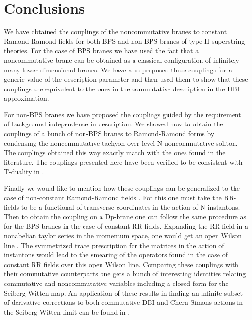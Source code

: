 \documentclass[a4paper,a4paper]{amsproc}
\theoremstyle{definition}
\theoremstyle{remark}
\numberwithin{equation}{section}
\begin{document}
\section{Conclusions}
We have obtained the couplings of the noncommutative branes to constant
Ramond-Ramond fields for both BPS and non-BPS branes of type II
superstring theories. For the case of BPS branes we have used the fact
that a noncommutative brane can be obtained as a classical
configuration of infinitely many lower dimensional branes. We have
also proposed these couplings for a generic value of the description
parameter and then used them to show that these couplings are
equivalent to the ones in the commutative \coordHE{} description in the
DBI approximation. 

For non-BPS branes we have proposed the couplings guided by the
requirement of background independence in \coordHE{} description. We
showed how to obtain the couplings of a bunch of non-BPS branes to
Ramond-Ramond forms by condensing the noncommutative tachyon over level N
noncommutative soliton. The couplings obtained this way exactly match
with the ones found in the literature. The couplings presented here
have been verified to be consistent with T-duality in \cite{tatar}.

Finally we would like to mention how these couplings can be
generalized to the case of non-constant Ramond-Ramond fields
\cite{okawao, smnvstwo, micheliutwo}. For this one must take the
RR-fields to be a functional of transverse coordinates in
the action of N instantons. Then to obtain the coupling on a Dp-brane
one can follow the same procedure as for the BPS branes in the case of
constant RR-fields. Expanding the RR-field in a
nonabelian taylor series in the momentum space, one would get an open
Wilson line \cite{liu, dastrivedi}. The symmetrized trace prescription
for the matrices in the action of instantons would lead to the
smearing of the operators found in the case of constant RR fields over
this open Wilson line. Comparing these couplings with their
commutative counterparts one gets a bunch of interesting identities
relating commutative and noncommutative variables including a closed
form for the Seiberg-Witten map. An application of these results in
finding an infinite subset of derivative corrections to both
commutative DBI and Chern-Simons actions in the Seiberg-Witten limit
can be found in \cite{sdsmnvs}.

\newpage
\end{document}
